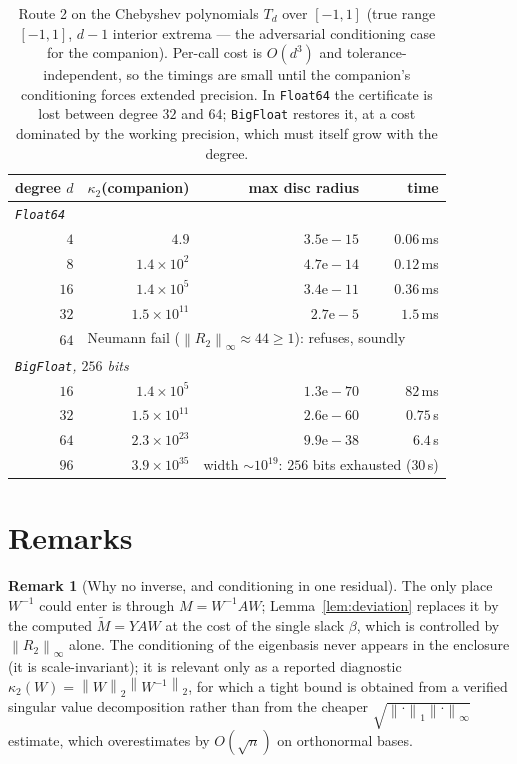 \documentclass[11pt,a4paper]{article}
\newcommand{\norm}[1]{\left\|#1\right\|}
\theoremstyle{plain}
\theoremstyle{definition}
\newtheorem{remark}[theorem]{Remark}
\begin{document}
\begin{table}[h]\centering
\begin{tabular}{rrrr}
\toprule
degree $d$ & $\kappa_2$(companion) & max disc radius & time \\
\midrule
\multicolumn{4}{l}{\emph{\texttt{Float64}}}\\
$4$  & $4.9$               & $3.5\mathrm{e}{-}15$ & $0.06$\,ms \\
$8$  & $1.4\times10^{2}$   & $4.7\mathrm{e}{-}14$ & $0.12$\,ms \\
$16$ & $1.4\times10^{5}$   & $3.4\mathrm{e}{-}11$ & $0.36$\,ms \\
$32$ & $1.5\times10^{11}$  & $2.7\mathrm{e}{-}5$  & $1.5$\,ms \\
$64$ & \multicolumn{3}{l}{Neumann fail ($\norm{R_2}_\infty\approx44\ge1$): refuses, soundly} \\
\midrule
\multicolumn{4}{l}{\emph{\texttt{BigFloat}, $256$ bits}}\\
$16$ & $1.4\times10^{5}$   & $1.3\mathrm{e}{-}70$ & $82$\,ms \\
$32$ & $1.5\times10^{11}$  & $2.6\mathrm{e}{-}60$ & $0.75$\,s \\
$64$ & $2.3\times10^{23}$  & $9.9\mathrm{e}{-}38$ & $6.4$\,s \\
$96$ & $3.9\times10^{35}$  & \multicolumn{2}{l}{width $\sim10^{19}$: $256$ bits exhausted ($30$\,s)} \\
\bottomrule
\end{tabular}
\caption{Route 2 on the Chebyshev polynomials $T_d$ over $[-1,1]$ (true range $[-1,1]$,
$d{-}1$ interior extrema --- the adversarial conditioning case for the companion). Per-call
cost is $O(d^3)$ and tolerance-independent, so the timings are small until the companion's
conditioning forces extended precision. In \texttt{Float64} the certificate is lost between
degree $32$ and $64$; \texttt{BigFloat} restores it, at a cost dominated by the working
precision, which must itself grow with the degree.}
\label{tab:polyrange}
\end{table}

\section{Remarks}\label{sec:remarks}

\begin{remark}[Why no inverse, and conditioning in one residual]
The only place $W^{-1}$ could enter is through $M=W^{-1}AW$; Lemma~\ref{lem:deviation}
replaces it by the computed $\widetilde M=YAW$ at the cost of the single slack $\beta$,
which is controlled by $\norm{R_2}_\infty$ alone. The conditioning of the eigenbasis
never appears in the enclosure (it is scale-invariant); it is relevant only as a
reported diagnostic $\kappa_2(W)=\norm{W}_2\norm{W^{-1}}_2$, for which a tight bound is
obtained from a verified singular value decomposition rather than from the cheaper
$\sqrt{\norm{\cdot}_1\norm{\cdot}_\infty}$ estimate, which overestimates by $O(\sqrt n)$
on orthonormal bases.
\end{remark}
\end{document}
